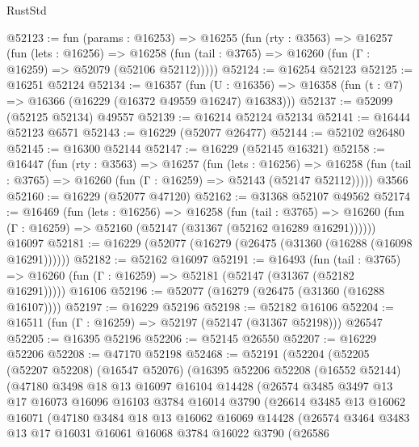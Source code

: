 \begin{lexlean}{RustStd}
\begin{coremodule}
@52123 := fun (params : @16253) =>
  @16255
    (fun (rty : @3563) =>
    @16257
      (fun (lets : @16256) =>
      @16258 (fun (tail : @3765) => @16260 (fun (Γ : @16259) => @52079 (@52106 @52112)))))
@52124 := @16254 @52123
@52125 := @16251 @52124
@52134 := @16357
    (fun (U : @16356) => @16358 (fun (t : @7) => @16366 (@16229 (@16372 @49559 @16247) @16383)))
@52137 := @52099 (@52125 @52134) @49557
@52139 := @16214 @52124 @52134
@52141 := @16444 @52123 @6571
@52143 := @16229 (@52077 @26477)
@52144 := @52102 @26480
@52145 := @16300 @52144
@52147 := @16229 (@52145 @16321)
@52158 := @16447
    (fun (rty : @3563) =>
    @16257
      (fun (lets : @16256) =>
      @16258 (fun (tail : @3765) => @16260 (fun (Γ : @16259) => @52143 (@52147 @52112)))))
    @3566
@52160 := @16229 (@52077 @47120)
@52162 := @31368 @52107 @49562
@52174 := @16469
    (fun (lets : @16256) =>
    @16258
      (fun (tail : @3765) =>
      @16260 (fun (Γ : @16259) => @52160 (@52147 (@31367 (@52162 @16289 @16291))))))
    @16097
@52181 := @16229 (@52077 (@16279 (@26475 (@31360 (@16288 (@16098 @16291))))))
@52182 := @52162 @16097
@52191 := @16493
    (fun (tail : @3765) => @16260 (fun (Γ : @16259) => @52181 (@52147 (@31367 (@52182 @16291)))))
    @16106
@52196 := @52077 (@16279 (@26475 (@31360 (@16288 @16107))))
@52197 := @16229 @52196
@52198 := @52182 @16106
@52204 := @16511 (fun (Γ : @16259) => @52197 (@52147 (@31367 @52198))) @26547
@52205 := @16395 @52196
@52206 := @52145 @26550
@52207 := @16229 @52206
@52208 := @47170 @52198
@52468 := @52191
    (@52204
      (@52205
        (@52207 @52208)
        (@16547 @52076)
        (@16395
          @52206
          @52208
          (@16552 @52144)
          (@47180
            @3498
            @18
            @13
            @16097
            @16104
            @14428
            (@26574
              @3485
              @3497
              @13
              @17
              @16073
              @16096
              @16103
              @3784
              @16014
              @3790
              (@26614
                @3485
                @13
                @16062
                @16071
                (@47180
                  @3484
                  @18
                  @13
                  @16062
                  @16069
                  @14428
                  (@26574
                    @3464
                    @3483
                    @13
                    @17
                    @16031
                    @16061
                    @16068
                    @3784
                    @16022
                    @3790
                    (@26586

\end{coremodule}
\end{lexlean}
